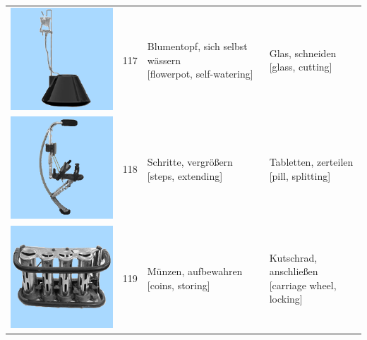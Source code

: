 \documentclass[
  english,
  doc,12pt,twoside,floatsintext]{apa7}
\begin{document}
\begin{center}
\begin{ThreePartTable}
{\begin{longtable}{llll}
\includegraphics[valign=c, scale=0.23]{../materials/unfamiliar/117.png} & 117 & \makecell[l]{Blumentopf, sich selbst wässern\\{[flowerpot, self-watering]}} & \makecell[l]{Glas, schneiden\\{[glass, cutting]}}\\
\includegraphics[valign=c, scale=0.23]{../materials/unfamiliar/118.png} & 118 & \makecell[l]{Schritte, vergrößern\\{[steps, extending]}} & \makecell[l]{Tabletten, zerteilen\\{[pill, splitting]}}\\
\includegraphics[valign=c, scale=0.23]{../materials/unfamiliar/119.png} & 119 & \makecell[l]{Münzen, aufbewahren\\{[coins, storing]}} & \makecell[l]{Kutschrad, anschließen\\{[carriage wheel, locking]}}\\

\end{longtable}}
\end{ThreePartTable}
\end{center}
\end{document}
